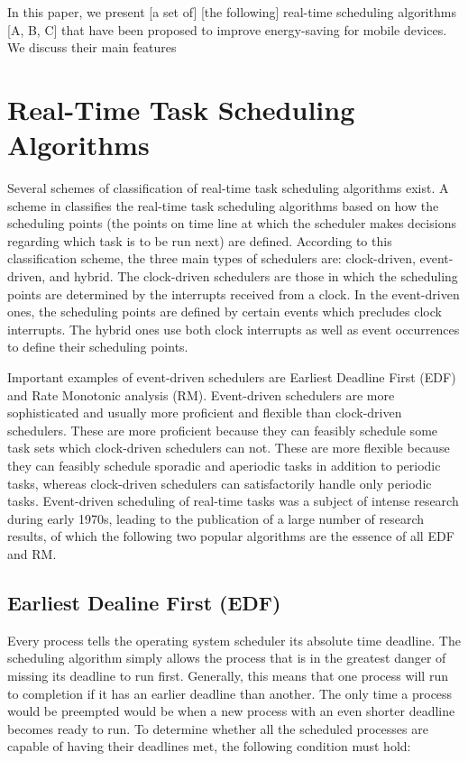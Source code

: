 \documentclass[10pt,article]{IEEEtran}
\begin{document}
In this paper, we present [a set of] [the following] real-time scheduling algorithms  [A, B, C] that have been proposed to improve energy-saving for mobile devices. We discuss their main features 


\section{Real-Time Task Scheduling Algorithms}
Several schemes of classification of real-time task scheduling algorithms exist. A scheme in \cite{mall} classifies the real-time task scheduling algorithms based on how the scheduling points (the points on time line at which the scheduler makes decisions regarding which task is to be run next) are defined. According to this classification scheme, the three main types of schedulers are: clock-driven, event-driven, and hybrid. The clock-driven schedulers are those in which the scheduling points are determined by the interrupts received from a clock. In the event-driven ones, the scheduling points are defined by certain events which precludes clock interrupts. The hybrid ones use both clock interrupts as well as event occurrences to define their scheduling points.


Important examples of event-driven schedulers are Earliest Deadline First (EDF) and Rate Monotonic analysis (RM). Event-driven schedulers are more sophisticated and usually more proficient and flexible than clock-driven schedulers. These are more proficient because they can feasibly schedule some task sets which clock-driven schedulers can not. These are more flexible because they can feasibly schedule sporadic and aperiodic tasks in addition to periodic tasks, whereas clock-driven schedulers can satisfactorily handle only periodic tasks\cite{mall}. Event-driven scheduling of real-time tasks was a subject of intense research during early 1970s, leading to the publication of a large number of research results, of which the following two popular algorithms are the essence of all EDF and RM\cite{w-s-liu}.



\subsection{Earliest Dealine First (EDF)}
Every process tells the operating system scheduler its absolute time deadline. The scheduling algorithm simply allows the process that is in the greatest danger of missing its deadline to run first. Generally, this means that one process will run to completion if it has an earlier deadline than another. The only time a process would be preempted would be when a new process with an even shorter deadline becomes ready to run. To determine whether all the scheduled processes are capable of having their deadlines met, the following condition must hold:
\end{document}
